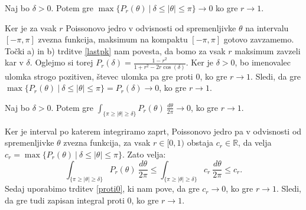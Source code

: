 \documentclass[mat1]{fmfdelo}
\begin{document}
    \begin{trditev}
        \label{proti0}
        Naj bo $\delta > 0$. Potem gre $\max\{P_r(\theta)~|~ \delta \leq |\theta| \leq \pi\} \to 0$ ko gre $r \to 1$.
    \end{trditev}
    \begin{dokaz}
        Ker je za vsak $r$ Poissonovo jedro v odvisnosti od spremenljivke $\theta$ na intervalu $[-\pi, \pi]$ zvezna funkcija, maksimum na kompaktu $[-\pi, \pi]$ gotovo zavzamemo. Točki a) in b) trditve \ref{lastpk} nam povesta, da bomo za vsak $r$ maksimum zavzeli kar v $\delta$. 
        Oglejmo si torej $P_r(\delta) = \frac{1 -r^2}{1 + r^2 - 2r \cos(\delta)}$. Ker je $\delta >0 $, bo imenovalec ulomka strogo pozitiven, števec ulomka pa gre proti $0$, ko gre $r \to 1$. 
        Sledi, da gre \mbox{$\max\{P_r(\theta)~|~ \delta \leq |\theta| \leq \pi\} = P_r(\delta) \to 0$}, ko gre $r \to 1$.
    \end{dokaz}
    \begin{posledica}
        \label{int_proti0}
        Naj bo $\delta > 0$. Potem gre ${\int_{\{\pi \geq |\theta| \geq \delta\}}{P_{r}(\theta)~\frac{d\theta}{2 \pi}}} \to 0$, ko gre $r \to 1$.
    \end{posledica}
    \begin{dokaz}
        Ker je interval po katerem integriramo zaprt, Poissonovo jedro pa v odvisnosti od spremenljivke $\theta$ zvezna funkcija, za vsak $r \in [0,1)$ obstaja $c_r \in \mathbb{R}$, da velja $c_r = \max\{P_r(\theta)~|~ \delta \leq |\theta| \leq \pi\}$. Zato velja:
        $$
        {\int_{\{\pi \geq |\theta| \geq \delta\}}{P_{r}(\theta)~\frac{d\theta}{2 \pi}}} \leq {\int_{\{\pi \geq |\theta| \geq \delta\}}{c_r~\frac{d\theta}{2 \pi}}} \leq c_r.
        $$
        Sedaj uporabimo trditev \ref{proti0}, ki nam pove, da gre $c_r \to 0$, ko gre $r \to 1$. Sledi, da gre tudi zapisan integral proti $0$, ko gre $r \to 1$.
    \end{dokaz}
\end{document}
